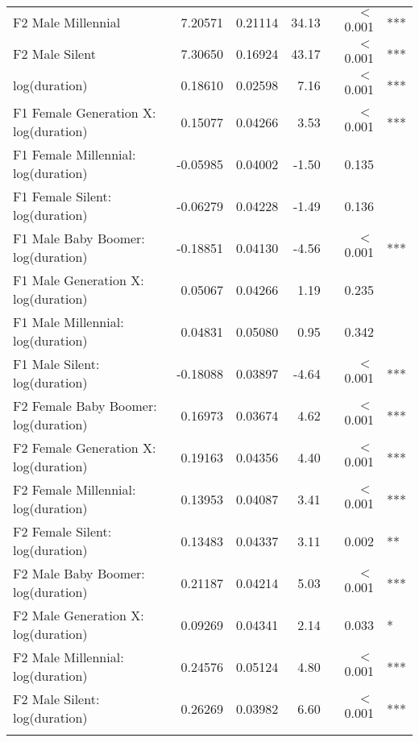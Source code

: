 \begin{table}[ht]
{{\begin{tabular}{l r r r r@{\hskip1pt} @{\hskip0pt}l}
{}F2 Male Millennial           &  7.20571 &   0.21114 &  34.13 &          $<$ 0.001 & *** \\
{}F2 Male Silent               &  7.30650 &   0.16924 &  43.17 &          $<$ 0.001 & *** \\
log(duration)                                        &  0.18610 &   0.02598 &   7.16 &          $<$ 0.001 & *** \\
{}F1 Female Generation X: log(duration)        &  0.15077 &   0.04266 &   3.53 &          $<$ 0.001 & *** \\
{}F1 Female Millennial: log(duration)  & -0.05985 &   0.04002 &  -1.50 &              0.135 &     \\
{}F1 Female Silent: log(duration)      & -0.06279 &   0.04228 &  -1.49 &              0.136 &     \\
{}F1 Male Baby Boomer: log(duration)      & -0.18851 &   0.04130 &  -4.56 &          $<$ 0.001 & *** \\
{}F1 Male Generation X: log(duration)        &  0.05067 &   0.04266 &   1.19 &              0.235 &     \\
{}F1 Male Millennial: log(duration)  &  0.04831 &   0.05080 &   0.95 &              0.342 &     \\
{}F1 Male Silent: log(duration)      & -0.18088 &   0.03897 &  -4.64 &          $<$ 0.001 & *** \\
{}F2 Female Baby Boomer: log(duration)      &  0.16973 &   0.03674 &   4.62 &          $<$ 0.001 & *** \\
{}F2 Female Generation X: log(duration)        &  0.19163 &   0.04356 &   4.40 &          $<$ 0.001 & *** \\
{}F2 Female Millennial: log(duration)  &  0.13953 &   0.04087 &   3.41 &          $<$ 0.001 & *** \\
{}F2 Female Silent: log(duration)      &  0.13483 &   0.04337 &   3.11 &              0.002 & **  \\
{}F2 Male Baby Boomer: log(duration)      &  0.21187 &   0.04214 &   5.03 &          $<$ 0.001 & *** \\
{}F2 Male Generation X: log(duration)        &  0.09269 &   0.04341 &   2.14 &              0.033 & *   \\
{}F2 Male Millennial: log(duration)  &  0.24576 &   0.05124 &   4.80 &          $<$ 0.001 & *** \\
{}F2 Male Silent: log(duration)      &  0.26269 &   0.03982 &   6.60 &          $<$ 0.001 & *** \\
\\

\end{tabular}}}
\end{table}
